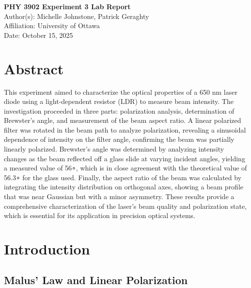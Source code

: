 \documentclass[12pt,a4paper]{article}
\begin{document}
\begin{center}
    {\LARGE\bfseries PHY 3902 Experiment 3 Lab Report}\\[1.5em]
    {\large Author(s): Michelle Johnstone, Patrick Geraghty}\\
    {\large Affiliation: University of Ottawa}\\
    {\large Date: October 15, 2025}
\end{center}

\section*{Abstract}
This experiment aimed to characterize the optical properties of a 650 nm laser diode using a light-dependent resistor (LDR) to measure beam intensity.
The investigation proceeded in three parts: polarization analysis, determination of Brewster's angle, and measurement of the beam aspect ratio.
A linear polarized filter was rotated in the beam path to analyze polarization, revealing a sinusoidal dependence of intensity on the filter angle, confirming the beam was partially linearly polarized.
Brewster's angle was determined by analyzing intensity changes as the beam reflected off a glass slide at varying incident angles, yielding a measured value of 56∘, which is in close agreement with the theoretical value of 56.3∘ for the glass used.
Finally, the aspect ratio of the beam was calculated by integrating the intensity distribution on orthogonal axes, showing a beam profile that was near Gaussian but with a minor asymmetry.
These results provide a comprehensive characterization of the laser's beam quality and polarization state, which is essential for its application in precision optical systems.

\section{Introduction}

\subsection{Malus' Law and Linear Polarization}
\end{document}

